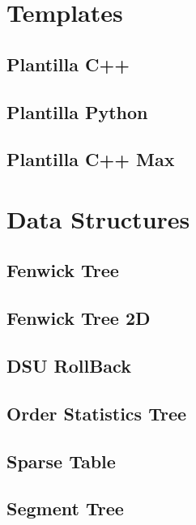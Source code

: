 \section{Templates}
\subsection{Plantilla C++}
\raggedbottom
\hrulefill
\subsection{Plantilla Python}
\raggedbottom
\hrulefill
\subsection{Plantilla C++ Max}
\raggedbottom
\hrulefill
\newpage

\section{Data Structures}
\subsection{Fenwick Tree}
\raggedbottom
\hrulefill
\subsection{Fenwick Tree 2D}
\raggedbottom
\hrulefill
\subsection{DSU RollBack}
\raggedbottom
\hrulefill
\subsection{Order Statistics Tree}
\raggedbottom
\hrulefill
\subsection{Sparse Table}
\raggedbottom
\hrulefill
\subsection{Segment Tree}
\raggedbottom
\hrulefill

